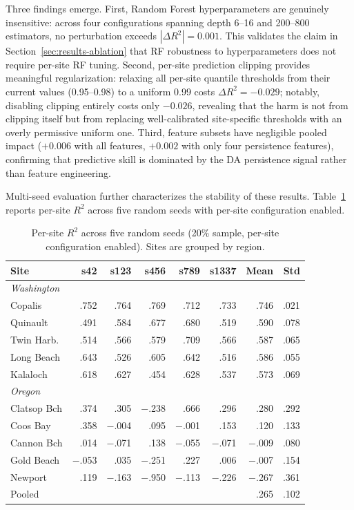 \documentclass[toxins,article,submit,moreauthors]{Definitions/mdpi}
\begin{document}
Three findings emerge. First, Random Forest hyperparameters are genuinely insensitive: across four configurations spanning depth 6--16 and 200--800 estimators, no perturbation exceeds $|\Delta R^2| = 0.001$. This validates the claim in Section~\ref{sec:results-ablation} that RF robustness to hyperparameters does not require per-site RF tuning. Second, per-site prediction clipping provides meaningful regularization: relaxing all per-site quantile thresholds from their current values (0.95--0.98) to a uniform 0.99 costs $\Delta R^2 = -0.029$; notably, disabling clipping entirely costs only $-0.026$, revealing that the harm is not from clipping itself but from replacing well-calibrated site-specific thresholds with an overly permissive uniform one. Third, feature subsets have negligible pooled impact ($+0.006$ with all features, $+0.002$ with only four persistence features), confirming that predictive skill is dominated by the DA persistence signal rather than feature engineering.

Multi-seed evaluation further characterizes the stability of these results. Table~\ref{tab:seed-stability} reports per-site $R^2$ across five random seeds with per-site configuration enabled.

\begin{table}[H]
\caption{Per-site $R^2$ across five random seeds (20\% sample, per-site configuration enabled). Sites are grouped by region.}
\label{tab:seed-stability}
\centering\scriptsize
\begin{tabular*}{\linewidth}{@{\extracolsep{\fill}}lrrrrrrr}
\toprule
\textbf{Site} & \textbf{s42} & \textbf{s123} & \textbf{s456} & \textbf{s789} & \textbf{s1337} & \textbf{Mean} & \textbf{Std} \\
\midrule
\multicolumn{8}{l}{\textit{Washington}} \\
Copalis      & .752 & .764 & .769 & .712 & .733 & .746 & .021 \\
Quinault     & .491 & .584 & .677 & .680 & .519 & .590 & .078 \\
Twin Harb.   & .514 & .566 & .579 & .709 & .566 & .587 & .065 \\
Long Beach   & .643 & .526 & .605 & .642 & .516 & .586 & .055 \\
Kalaloch     & .618 & .627 & .454 & .628 & .537 & .573 & .069 \\
\midrule
\multicolumn{8}{l}{\textit{Oregon}} \\
Clatsop Bch  & .374 & .305 & $-$.238 & .666 & .296 & .280 & .292 \\
Coos Bay     & .358 & $-$.004 & .095 & $-$.001 & .153 & .120 & .133 \\
Cannon Bch   & .014 & $-$.071 & .138 & $-$.055 & $-$.071 & $-$.009 & .080 \\
Gold Beach   & $-$.053 & .035 & $-$.251 & .227 & .006 & $-$.007 & .154 \\
Newport      & .119 & $-$.163 & $-$.950 & $-$.113 & $-$.226 & $-$.267 & .361 \\
\midrule
\multicolumn{2}{l}{Pooled} & & & & & .265 & .102 \\
\bottomrule
\end{tabular*}
\end{table}
\end{document}
